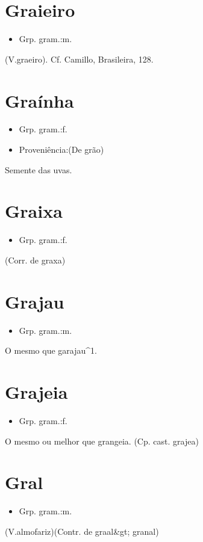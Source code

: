 \section{Graieiro}
\begin{itemize}
\item {Grp. gram.:m.}
\end{itemize}
(V.graeiro). Cf. Camillo, \textunderscore Brasileira\textunderscore , 128.
\section{Graínha}
\begin{itemize}
\item {Grp. gram.:f.}
\end{itemize}
\begin{itemize}
\item {Proveniência:(De \textunderscore grão\textunderscore )}
\end{itemize}
Semente das uvas.
\section{Graixa}
\begin{itemize}
\item {Grp. gram.:f.}
\end{itemize}
(Corr. de \textunderscore graxa\textunderscore )
\section{Grajau}
\begin{itemize}
\item {Grp. gram.:m.}
\end{itemize}
O mesmo que \textunderscore garajau\textunderscore ^1.
\section{Grajeia}
\begin{itemize}
\item {Grp. gram.:f.}
\end{itemize}
O mesmo ou melhor que \textunderscore grangeia\textunderscore .
(Cp. cast. \textunderscore grajea\textunderscore )
\section{Gral}
\begin{itemize}
\item {Grp. gram.:m.}
\end{itemize}
(V.almofariz)(Contr. de \textunderscore graal\textunderscore  &gt; \textunderscore granal\textunderscore )
